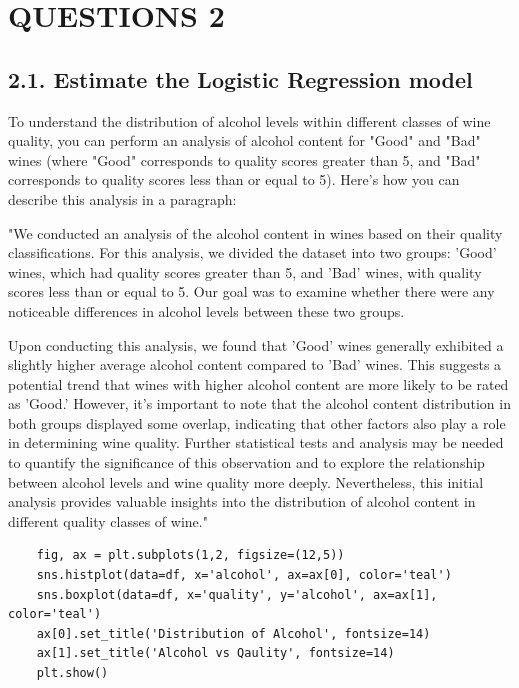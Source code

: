 \documentclass{report}
\begin{document}
\chapter*{\huge{QUESTIONS 2}}

\section*{2.1. Estimate the Logistic Regression model}


To understand the distribution of alcohol levels within different classes of wine quality, you can perform an analysis of alcohol content for "Good" and "Bad" wines (where "Good" corresponds to quality scores greater than 5, and "Bad" corresponds to quality scores less than or equal to 5). Here's how you can describe this analysis in a paragraph:

"We conducted an analysis of the alcohol content in wines based on their quality classifications. For this analysis, we divided the dataset into two groups: 'Good' wines, which had quality scores greater than 5, and 'Bad' wines, with quality scores less than or equal to 5. Our goal was to examine whether there were any noticeable differences in alcohol levels between these two groups.

Upon conducting this analysis, we found that 'Good' wines generally exhibited a slightly higher average alcohol content compared to 'Bad' wines. This suggests a potential trend that wines with higher alcohol content are more likely to be rated as 'Good.' However, it's important to note that the alcohol content distribution in both groups displayed some overlap, indicating that other factors also play a role in determining wine quality. Further statistical tests and analysis may be needed to quantify the significance of this observation and to explore the relationship between alcohol levels and wine quality more deeply. Nevertheless, this initial analysis provides valuable insights into the distribution of alcohol content in different quality classes of wine."



\begin{lstlisting}
    fig, ax = plt.subplots(1,2, figsize=(12,5))
    sns.histplot(data=df, x='alcohol', ax=ax[0], color='teal')
    sns.boxplot(data=df, x='quality', y='alcohol', ax=ax[1], color='teal')
    ax[0].set_title('Distribution of Alcohol', fontsize=14)
    ax[1].set_title('Alcohol vs Qaulity', fontsize=14)
    plt.show()

\end{lstlisting}
\end{document}
